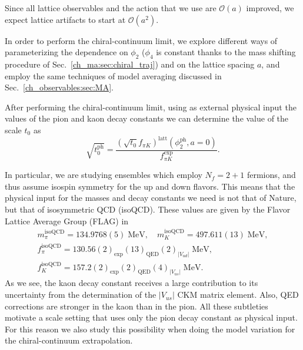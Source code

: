 Since all lattice observables and the action that we use are $\mathcal{O}(a)$ improved, we expect lattice artifacts to start at $\mathcal{O}(a^2)$. 

In order to perform the chiral-continuum limit, we explore different ways of parameterizing the dependence on $\phi_2$ ($\phi_4$ is constant thanks to the mass shifting procedure of Sec.~\ref{ch_ma:sec:chiral_traj}) and on the lattice spacing $a$, and employ the same techniques of model averaging discussed in Sec.~\ref{ch_observables:sec:MA}.

After performing the chiral-continuum limit, using as external physical input the values of the pion and kaon decay constants we can determine the value of the scale $t_0$ as
\begin{equation}
\sqrt{t_0^{\textrm{ph}}}=\frac{\left(\sqrt{t_0}f_{\pi K}\right)^{\textrm{latt}}
(\phi_2^{\textrm{ph}},a=0)}{f_{\pi K}^{\textrm{exp}}}.
\end{equation}

In particular, we are studying ensembles which employ $N_f=2+1$ fermions, and thus assume isospin symmetry for the up and down flavors. This means that the physical input for the masses and decay constants we need is not that of Nature, but that of isosymmetric QCD (isoQCD). These values are given by the Flavor Lattice Average Group (FLAG) in~\citep{FlavourLatticeAveragingGroupFLAG:2021npn}
\begin{gather}
\label{ch_ss:eq:isoQCD}
m_{\pi}^{\textrm{isoQCD}}=134.9768(5)\;{\textrm{MeV}}, \quad
m_{K}^{\textrm{isoQCD}}=497.611(13)\;{\textrm{MeV}}, \\
f_{\pi}^{\textrm{isoQCD}}=130.56(2)_{\textrm{exp}}(13)_{\textrm{QED}}(2)_{|V_{ud}|}\;{\textrm{MeV}}, \quad \\
f_{K}^{\textrm{isoQCD}}=157.2(2)_{\textrm{exp}}(2)_{\textrm{QED}}(4)_{|V_{us}|}\;{\textrm{MeV}}.
\end{gather} 
As we see, the kaon decay constant receives a large contribution to its uncertainty from the determination of the $|V_{us}|$ CKM matrix element. Also, QED corrections are stronger in the kaon than in the pion. All these subtleties motivate a scale setting that uses only the pion decay constant as physical input. For this reason we also study this possibility when doing the model variation for the chiral-continuum extrapolation.



